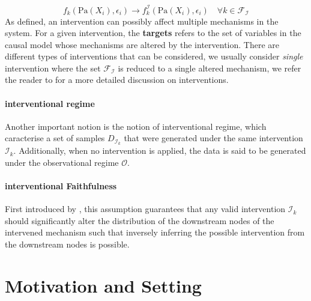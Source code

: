 \documentclass{article}
\begin{document}
\begin{equation}
    f_k(\text{Pa}(X_i), \epsilon_i) \rightarrow f_k^{\mathcal{I}}(\text{Pa}(X_i), \epsilon_i) \quad \forall k \in \mathcal{F}_{\mathcal{I}}
\end{equation}
As defined, an intervention can possibly affect multiple mechanisms in the system.
For a given intervention, the \textbf{targets} refers to the set of variables in the causal model whose mechanisms are altered by the intervention. There are different types of interventions that can be considered, we usually consider \textit{single} intervention where the set $\mathcal{F}_{\mathcal{I}}$ is reduced to a single altered mechanism, we refer the reader to \citet{Pearl_2009} for a more detailed discussion on interventions.

\paragraph{interventional regime}
Another important notion is the notion of interventional regime, which
caracterise a set of samples $D_{\mathcal{I}_k}$ that were generated under the
same intervention $\mathcal{I}_k$. Additionally, when no intervention is
applied, the data is said to be generated under the observational regime
$\mathcal{O}$.

\paragraph{interventional Faithfulness} First introduced by \citet{chevalley2024derivingcausalordersinglevariable},
this assumption guarantees that any valid intervention $\mathcal{I}_k$ should
significantly alter the distribution of the downstream nodes of the intervened
mechanism such that inversely inferring the possible intervention from the
downstream nodes is possible.

\section{Motivation and Setting}\label{subsec:setting}
\end{document}
